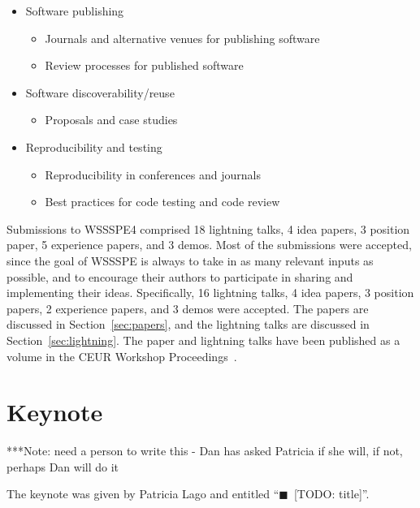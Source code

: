 \documentclass[11pt, oneside]{amsart}
\newcommand{\todo}[1]{{\color{blue}$\blacksquare$~\textsf{[TODO: #1]}}}
\newcommand{\note}[1]{ {\textcolor{blueish}    { ***Note:      #1 }}}
\begin{document}
\begin{itemize}
\item Software publishing
\begin{itemize}
    \item Journals and alternative venues for publishing software
    \item Review processes for published software
\end{itemize}

\item Software discoverability/reuse
\begin{itemize}
    \item Proposals and case studies
\end{itemize}

\item Reproducibility and testing
\begin{itemize}
    \item Reproducibility in conferences and journals
    \item Best practices for code testing and code review
\end{itemize}

\end{itemize}

Submissions to WSSSPE4 comprised
18 lightning talks,
4 idea papers,
3 position paper,
5 experience papers,
and
3 demos.
Most of the submissions were accepted, since the goal of WSSSPE is always to
take in as many relevant inputs as possible, and to encourage their authors to
participate in sharing and implementing their ideas.
Specifically,
16 lightning talks,
4 idea papers,
3 position papers,
2 experience papers,
and
3 demos
were accepted.
The papers are discussed in Section~\ref{sec:papers},
and the lightning talks are discussed in Section~\ref{sec:lightning}.
The paper and lightning talks have been published as a volume in the CEUR Workshop Proceedings~\cite{WSSSPE4-proceedings}.

\section{Keynote}\label{sec:keynote}

\note{need a person to write this - Dan has asked Patricia if she will, if not, perhaps Dan will do it}

The keynote was given by Patricia Lago and entitled ``\todo{title}''.

\end{document}
